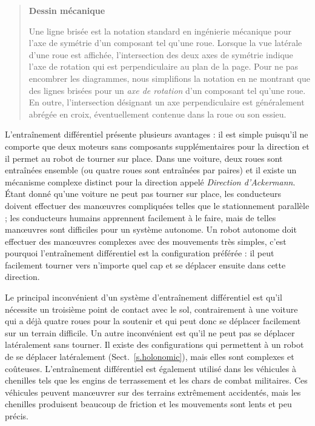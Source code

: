 \begin{quote}
\begin{center}
\textbf{Dessin mécanique}
\end{center}
Une ligne brisée est la notation standard en ingénierie mécanique pour l'axe de symétrie d'un composant tel qu'une roue. Lorsque la vue latérale d'une roue est affichée, l'intersection des deux axes de symétrie indique l'axe de rotation qui est perpendiculaire au plan de la page. Pour ne pas encombrer les diagrammes, nous simplifions la notation en ne montrant que des lignes brisées pour un \emph{axe de rotation} d'un composant tel qu'une roue. En outre, l'intersection désignant un axe perpendiculaire est généralement abrégée en croix, éventuellement contenue dans la roue ou son essieu.
\end{quote}

L'entraînement différentiel présente plusieurs avantages : il est simple puisqu'il ne comporte que deux moteurs sans composants supplémentaires pour la direction et il permet au robot de tourner sur place. Dans une voiture, deux roues sont entraînées ensemble (ou quatre roues sont entraînées par paires) et il existe un mécanisme complexe distinct pour la direction appelé \emph{Direction d'Ackermann}. Étant donné qu'une voiture ne peut pas tourner sur place, les conducteurs doivent effectuer des manœuvres compliquées telles que le stationnement parallèle ; les conducteurs humains apprennent facilement à le faire, mais de telles manœuvres sont difficiles pour un système autonome. Un robot autonome doit effectuer des manœuvres complexes avec des mouvements très simples, c'est pourquoi l'entraînement différentiel est la configuration préférée : il peut facilement tourner vers n'importe quel cap et se déplacer ensuite dans cette direction.

Le principal inconvénient d'un système d'entraînement différentiel est qu'il nécessite un troisième point de contact avec le sol, contrairement à une voiture qui a déjà quatre roues pour la soutenir et qui peut donc se déplacer facilement sur un terrain difficile. Un autre inconvénient est qu'il ne peut pas se déplacer latéralement sans tourner. Il existe des configurations qui permettent à un robot de se déplacer latéralement (Sect.~\ref{s.holonomic}), mais elles sont complexes et coûteuses. L'entraînement différentiel est également utilisé dans les véhicules à chenilles tels que les engins de terrassement et les chars de combat militaires. Ces véhicules peuvent manœuvrer sur des terrains extrêmement accidentés, mais les chenilles produisent beaucoup de friction et les mouvements sont lents et peu précis.

